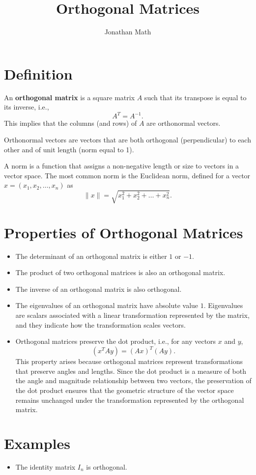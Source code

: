 \documentclass{article}
\title{\vspace{-2cm}Orthogonal Matrices}
\author{Jonathan Math}
\date{}
\begin{document}
\maketitle

\section*{Definition}
An \textbf{orthogonal matrix} is a square matrix $A$ such that its transpose is equal to its inverse, i.e.,
\[A^T = A^{-1}.\]
This implies that the columns (and rows) of $A$ are orthonormal vectors.

Orthonormal vectors are vectors that are both orthogonal (perpendicular) to each other and of unit length (norm equal to 1).

A norm is a function that assigns a non-negative length or size to vectors in a vector space. The most common norm is the Euclidean norm, defined for a vector $x = (x_1, x_2, \ldots, x_n)$ as
\[\|x\| = \sqrt{x_1^2 + x_2^2 + \ldots + x_n^2}.\]
\section*{Properties of Orthogonal Matrices}
\begin{itemize}
    \item The determinant of an orthogonal matrix is either $1$ or $-1$.
    \item The product of two orthogonal matrices is also an orthogonal matrix.
    \item The inverse of an orthogonal matrix is also orthogonal.
    \item The eigenvalues of an orthogonal matrix have absolute value $1$. Eigenvalues are scalars associated with a linear transformation represented by the matrix, and they indicate how the transformation scales vectors.
    \item Orthogonal matrices preserve the dot product, i.e., for any vectors $x$ and $y$,
        \[(x^T A y) = (Ax)^T (Ay).\] 
        This property arises because orthogonal matrices represent transformations that preserve angles and lengths. Since the dot product is a measure of both the angle and magnitude relationship between two vectors, the preservation of the dot product ensures that the geometric structure of the vector space remains unchanged under the transformation represented by the orthogonal matrix.
\end{itemize}
\section*{Examples}
\begin{itemize}
    \item The identity matrix $I_n$ is orthogonal.
\end{itemize}
\end{document}
